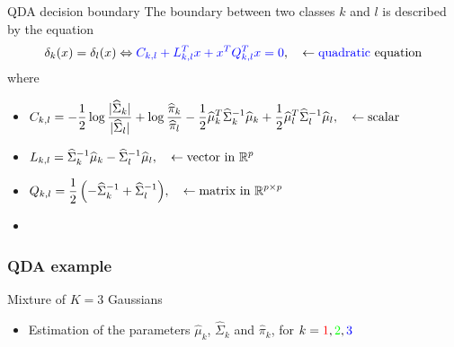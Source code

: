 \begin{frame}{QDA decision boundary}
The boundary between two classes $k$ and $l$ is described by the equation
\begin{align*}
\delta_k(x)= \delta_l(x)  \Leftrightarrow {\textcolor{blue}{ C_{k,l} + L_{k,l}^T x + x^T  Q_{k,l}^T x= 0}}, \quad \leftarrow \textrm{{\textcolor{blue}{quadratic}} equation}
\end{align*}
where
\begin{itemize}
 \item $\begin{displaystyle}
        C_{k,l}= { -\frac{1}{2} \log \frac{|\widehat{\Sigma}_k|}{ |\widehat{\Sigma}_l|} + \log \frac{\widehat{\pi}_k}{\widehat{\pi}_l}
        - \frac{1}{2} {\widehat{\mu}_k}^T \widehat{\Sigma}_k^{-1} \widehat{\mu}_k + \frac{1}{2}
 {\widehat{\mu}_l}^T \widehat{\Sigma}_l^{-1} \widehat{\mu}_l},
       \end{displaystyle} \quad \leftarrow \textrm{scalar}$
 \item $\begin{displaystyle}
          L_{k,l}= { \widehat{\Sigma}_k^{-1} \widehat{\mu}_k - \widehat{\Sigma}_l^{-1} \widehat{\mu}_l},
        \end{displaystyle}\quad \leftarrow \textrm{vector in } \mathbb{R}^p$
\item $\begin{displaystyle}
          Q_{k,l}= { \frac{1}{2} \left( -\widehat{\Sigma}_k^{-1} + \widehat{\Sigma}_l^{-1} \right)},
        \end{displaystyle}\quad \leftarrow \textrm{matrix in } \mathbb{R}^{p \times p}$
\end{itemize}

\begin{itemize}
 \item[\doigt] 
\end{itemize}


\end{frame}



\begin{frame}
  \frametitle{QDA example}
\begin{block}{Mixture of $K=3$ Gaussians}
\begin{itemize}
   \item Estimation of the parameters $\hat{\mu}_k$, $\hat{\Sigma}_k$ and $\hat{\pi}_k$, for
   $k= \textcolor{red}{1},\textcolor{green}{2},\textcolor{blue}{3}$
\end{itemize}
\end{block}
\vspace*{-5mm}


\begin{center}
\end{center}

\end{frame}

